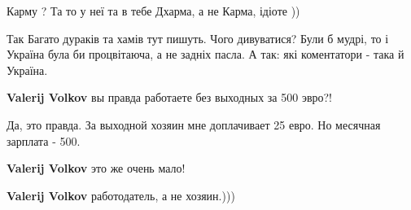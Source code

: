 \begin{itemize}
\begin{itemize}
Карму ?
Та то у неї та в тебе Дхарма, а не Карма, ідіоте ))
\end{itemize}

 
Так
Багато дураків та хамів тут пишуть.
Чого дивуватися?
Були б мудрі, то і Україна була би процвітаюча, а не задніх пасла.
А так: які коментатори - така й Україна.

\begin{itemize}
 
\textbf{Valerij Volkov} вы правда работаете без выходных за 500 эвро?!

 
Да, это правда.
За выходной хозяин мне доплачивает 25 евро.
Но месячная зарплата - 500.

 
\textbf{Valerij Volkov} это же очень мало!

 
\textbf{Valerij Volkov} работодатель, а не хозяин.)))

 

\end{itemize}
\end{itemize}
